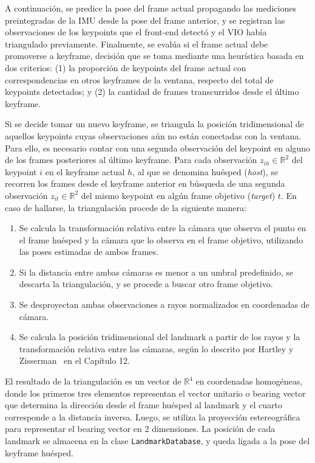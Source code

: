 A continuación, se predice la pose del frame actual propagando las mediciones preintegradas de la IMU desde la pose del frame anterior, y se registran las observaciones de los keypoints que el front-end detectó y el VIO había triangulado previamente. Finalmente, se evalúa si el frame actual debe promoverse a keyframe, decisión que se toma mediante una heurística basada en dos criterios: (1) la proporción de keypoints del frame actual con correspondencias en otros keyframes de la ventana, respecto del total de keypoints detectados; y (2) la cantidad de frames transcurridos desde el último keyframe.

Si se decide tomar un nuevo keyframe, se triangula la posición tridimensional de aquellos keypoints cuyas observaciones aún no están conectadas con la ventana. Para ello, es necesario contar con una segunda observación del keypoint en alguno de los frames posteriores al último keyframe. Para cada observación $z_{ih} \in \mathbb{R}^2$ del keypoint $i$ en el keyframe actual $h$, al que se denomina huésped (\textit{host}), se recorren los frames desde el keyframe anterior en búsqueda de una segunda observación $z_{it} \in \mathbb{R}^2$ del mismo keypoint en algún frame objetivo (\textit{target}) $t$. En caso de hallarse, la triangulación procede de la siguiente manera:
\begin{enumerate}
    \item Se calcula la transformación relativa entre la cámara que observa el punto en el frame huésped y la cámara que lo observa en el frame objetivo, utilizando las poses estimadas de ambos frames.
    \item Si la distancia entre ambas cámaras es menor a un umbral predefinido, se descarta la triangulación, y se procede a buscar otro frame objetivo.
    \item Se desproyectan ambas observaciones a rayos normalizados en coordenadas de cámara.
    \item Se calcula la posición tridimensional del landmark a partir de los rayos y la transformación relativa entre las cámaras, según lo descrito por Hartley y Zisserman~\cite{hartley2004multipleviewgeometry} en el Capítulo 12.
\end{enumerate}

El resultado de la triangulación es un vector de $\mathbb{R}^4$ en coordenadas homogéneas, donde los primeros tres elementos representan el vector unitario o bearing vector que determina la dirección desde el frame huésped al landmark y el cuarto corresponde a la distancia inversa. Luego, se utiliza la proyección estereográfica para representar el bearing vector en 2 dimensiones. La posición de cada landmark se almacena en la clase \texttt{LandmarkDatabase}, y queda ligada a la pose del keyframe huésped.

